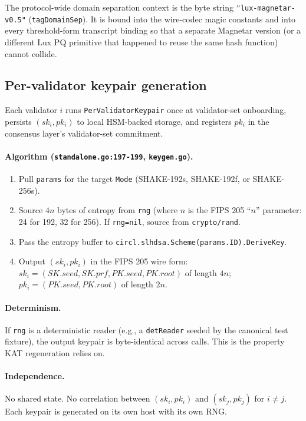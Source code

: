 The protocol-wide domain separation context is the byte string
\texttt{"lux-magnetar-v0.5"} (\texttt{tagDomainSep}). It is bound
into the wire-codec magic constants and into every threshold-form
transcript binding so that a separate Magnetar version (or a
different Lux PQ primitive that happened to reuse the same hash
function) cannot collide.

\subsection{Per-validator keypair generation}
\label{sec:construction:keygen}

Each validator $i$ runs \texttt{PerValidatorKeypair} once at
validator-set onboarding, persists $(sk_i, pk_i)$ to local
HSM-backed storage, and registers $pk_i$ in the consensus layer's
validator-set commitment.

\paragraph{Algorithm (\texttt{standalone.go:197-199},
\texttt{keygen.go}).}
\begin{enumerate}[leftmargin=2em,nosep]
  \item Pull \texttt{params} for the target \texttt{Mode}
        (SHAKE-192s, SHAKE-192f, or SHAKE-256s).
  \item Source $4n$ bytes of entropy from \texttt{rng} (where $n$ is
        the FIPS 205 ``$n$'' parameter: 24 for 192, 32 for 256).
        If \texttt{rng=nil}, source from \texttt{crypto/rand}.
  \item Pass the entropy buffer to
        \texttt{circl.slhdsa.Scheme(params.ID).DeriveKey}.
  \item Output $(sk_i, pk_i)$ in the FIPS 205 wire form: $sk_i =
        (\mathit{SK.seed}, \mathit{SK.prf}, \mathit{PK.seed},
        \mathit{PK.root})$ of length $4n$; $pk_i = (\mathit{PK.seed},
        \mathit{PK.root})$ of length $2n$.
\end{enumerate}

\paragraph{Determinism.} If \texttt{rng} is a deterministic reader
(e.g., a \texttt{detReader} seeded by the canonical test fixture),
the output keypair is byte-identical across calls. This is the
property KAT regeneration relies on.

\paragraph{Independence.} No shared state. No correlation between
$(sk_i, pk_i)$ and $(sk_j, pk_j)$ for $i \ne j$. Each keypair is
generated on its own host with its own RNG.

